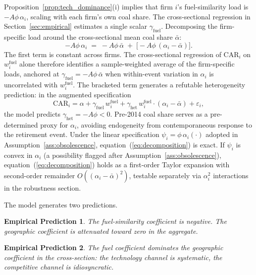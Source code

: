 \documentclass[12pt,a4paper]{article}
\newtheorem{prediction}{Empirical Prediction}
\begin{document}
Proposition~\ref{prop:tech_dominance}(i) implies that firm $i$'s fuel-similarity load is $-A\phi\,\alpha_i$, scaling with each firm's own coal share. The cross-sectional regression in Section~\ref{sec:empirical} estimates a single scalar $\gamma_{\mathrm{fuel}}$. Decomposing the firm-specific load around the cross-sectional mean coal share $\bar\alpha$:
\begin{equation}\label{eq:decomposition}
    -A\phi\,\alpha_i \;=\; -A\phi\,\bar\alpha \;+\; \bigl[-A\phi\,(\alpha_i - \bar\alpha)\bigr].
\end{equation}
The first term is constant across firms. The cross-sectional regression of $\mathrm{CAR}_i$ on $w^{\mathrm{fuel}}_i$ alone therefore identifies a sample-weighted average of the firm-specific loads, anchored at $\gamma_{\mathrm{fuel}} = -A\phi\,\bar\alpha$ when within-event variation in $\alpha_i$ is uncorrelated with $w^{\mathrm{fuel}}_i$. The bracketed term generates a refutable heterogeneity prediction: in the augmented specification
\begin{equation}\label{eq:augmented}
    \mathrm{CAR}_i = \alpha + \gamma_{\mathrm{fuel}}\, w^{\mathrm{fuel}}_i + \gamma_{\mathrm{het}}\, w^{\mathrm{fuel}}_i \cdot (\alpha_i - \bar\alpha) + \varepsilon_i,
\end{equation}
the model predicts $\gamma_{\mathrm{het}} = -A\phi < 0$. Pre-2014 coal share serves as a pre-determined proxy for $\alpha_i$, avoiding endogeneity from contemporaneous response to the retirement event. Under the linear specification $\psi_i = \phi\,\alpha_i(\cdot)$ adopted in Assumption~\ref{ass:obsolescence}, equation~(\ref{eq:decomposition}) is exact. If $\psi_i$ is convex in $\alpha_i$ (a possibility flagged after Assumption~\ref{ass:obsolescence}), equation~(\ref{eq:decomposition}) holds as a first-order Taylor expansion with second-order remainder $O((\alpha_i - \bar\alpha)^2)$, testable separately via $\alpha_i^2$ interactions in the robustness section.

The model generates two predictions.\label{prop:ets}

\begin{prediction}\label{pred:fuel}
The fuel-similarity coefficient is negative. The geographic coefficient is attenuated toward zero in the aggregate.
\end{prediction}

\begin{prediction}\label{pred:dominance}
The fuel coefficient dominates the geographic coefficient in the cross-section: the technology channel is systematic, the competitive channel is idiosyncratic.
\end{prediction}
\end{document}
